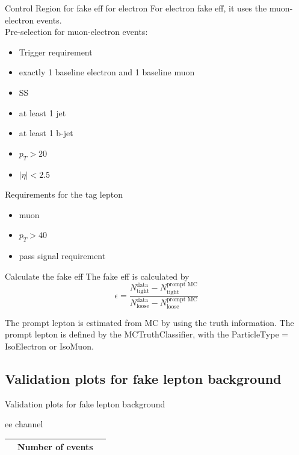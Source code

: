 \documentclass[mathserif,serif]{beamer}
\begin{document}
\begin{frame}{Control Region for fake eff for electron}
For electron fake eff, it uses the muon-electron events. \\
Pre-selection for muon-electron events:
\begin{itemize}
\item Trigger requirement
\item exactly 1 baseline electron and 1 baseline muon
\item SS
\item at least 1 jet
\item at least 1 b-jet
\item $p_T > 20$
\item $|\eta| < 2.5$
\end{itemize}
Requirements for the tag lepton
\begin{itemize}
\item muon
\item $p_T > 40$
\item pass signal requirement
\end{itemize}
\end{frame}

\begin{frame}{Calculate the fake eff}
The fake eff is calculated by
\begin{equation*}
\epsilon = \frac{N^{\text{data}}_{\text{tight}} - N^{\text{prompt MC}}_{\text{tight}}}{N^{\text{data}}_{\text{loose}} - N^{\text{prompt MC}}_{\text{loose}}}
\end{equation*}

The prompt lepton is estimated from MC by using the truth information. The prompt lepton is defined by the MCTruthClassifier, with the ParticleType = IsoElectron or IsoMuon.
\end{frame}

\subsection{Validation plots for fake lepton background}
\begin{frame}
\begin{center}
\huge
Validation plots for fake lepton background
\end{center}
\end{frame}

\begin{frame}{ee channel}
\vspace{5mm}
\begin{tabular}{|c|c|c|}
\hline
& Number of events & \\
\hline

\end{tabular}
\end{frame}
\end{document}

